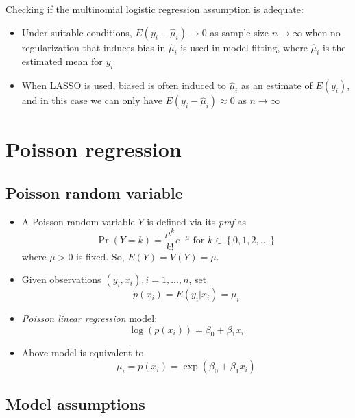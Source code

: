 \documentclass[]{article}
\begin{document}
Checking if the multinomial logistic regression assumption is adequate:

\begin{itemize}
\item
  Under suitable conditions,
  \(E\left( y_{i}-\hat{\mu}_{i}\right)\rightarrow0\) as sample size
  \(n\rightarrow\infty\) when no regularization that induces bias in
  \(\hat{\mu}_{i}\) is used in model fitting, where \(\hat{\mu}_{i}\) is
  the estimated mean for \(y_{i}\)
\item
  When LASSO is used, biased is often induced to \(\hat{\mu}_{i}\) as an
  estimate of \(E\left( y_{i}\right)\), and in this case we can only
  have \(E\left(y_{i}-\hat{\mu}_{i}\right)\approx 0\) as
  \(n\rightarrow\infty\)
\end{itemize}

\section{Poisson regression}\label{poisson-regression}

\subsection{Poisson random variable}\label{poisson-random-variable}

\begin{itemize}
\item
  A Poisson random variable \(Y\) is defined via its \emph{pmf} as \[
  \Pr\left(  Y=k\right)  =\frac{\mu^{k}}{k!}e^{-\mu}\text{ for }k\in\left\{
  0,1,2,\ldots\right\}
  \] where \(\mu>0\) is fixed. So,
  \(E\left( Y\right) =V\left( Y\right)=\mu\).
\item
  Given observations \(\left( y_{i},x_{i}\right), i=1,...,n\), set
  \[p\left(  x_{i}\right)  =E\left(  y_{i}|x_{i}\right)  =\mu_{i}\]
\item
  \emph{Poisson linear regression} model: \[
  \log\left(  p\left(  x_{i}\right)  \right)  =\beta_{0}+\beta_{1}x_{i}
  \]
\item
  Above model is equivalent to \[
  \mu_{i}=p\left(  x_{i}\right)  =\exp\left(  \beta_{0}+\beta_{1}x_{i}\right)
  \]
\end{itemize}

\subsection{Model assumptions}\label{model-assumptions}
\end{document}
